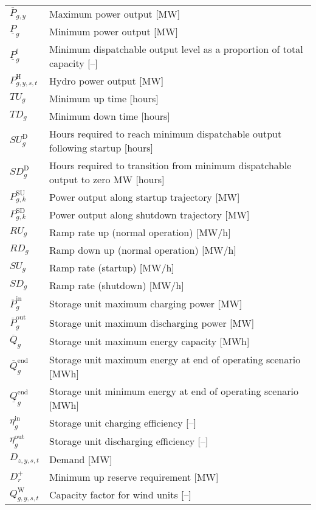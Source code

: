 \documentclass{article}
\newcommand{\iGenerator}{g}
\newcommand{\iYear}{y}
\newcommand{\iScenario}{s}
\newcommand{\iInterval}{t}
\newcommand{\iIntervalAlias}{k}
\newcommand{\iZone}{z}
\newcommand{\iRegion}{r}
\newcommand{\cPowerOutputMax}[1][\iGenerator,\iYear]{\overline{P}_{#1}}
\newcommand{\cReserveUpRequirement}[1][\iRegion]{D^{+}_{#1}}
\newcommand{\cUpTimeMin}[1][\iGenerator]{TU_{#1}}
\newcommand{\cDownTimeMin}[1][\iGenerator]{TD_{#1}}
\newcommand{\cRampRateUp}[1][\iGenerator]{RU_{#1}}
\newcommand{\cRampRateDown}[1][\iGenerator]{RD_{#1}}
\newcommand{\cPowerOutputMin}[1][\iGenerator]{\underline{P}_{#1}}
\newcommand{\cStartupDuration}[1][\iGenerator]{SU_{#1}^{\mathrm{D}}}
\newcommand{\cStartupTrajectory}[1][\iGenerator,\iIntervalAlias]{P^{\mathrm{SU}}_{#1}}
\newcommand{\cShutdownDuration}[1][\iGenerator]{SD_{#1}^{\mathrm{D}}}
\newcommand{\cShutdownTrajectory}[1][\iGenerator,\iIntervalAlias]{P^{\mathrm{SD}}_{#1}}
\newcommand{\cCapacityFactorWind}[1][\iGenerator,\iYear,\iScenario,\iInterval]{Q_{#1}^{\mathrm{W}}}
\newcommand{\cPowerChargingMax}[1][\iGenerator]{\overline{P}^{\mathrm{in}}_{#1}}
\newcommand{\cPowerDischargingMax}[1][\iGenerator]{\overline{P}^{\mathrm{out}}_{#1}}
\newcommand{\cStorageUnitEnergyMax}[1][\iGenerator]{\overline{Q}_{#1}}
\newcommand{\cStorageUnitEnergyIntervalEndMax}[1][\iGenerator]{\overline{Q}^{\mathrm{end}}_{#1}}
\newcommand{\cStorageUnitEnergyIntervalEndMin}[1][\iGenerator]{\underline{Q}^{\mathrm{end}}_{#1}}
\newcommand{\cStorageUnitEfficiencyCharging}{\eta_{\iGenerator}^{\mathrm{in}}}
\newcommand{\cStorageUnitEfficiencyDischarging}{\eta_{\iGenerator}^{\mathrm{out}}}
\newcommand{\cDemand}[1][\iZone,\iYear,\iScenario,\iInterval]{D_{#1}}
\newcommand{\cPowerOutputMinProportion}{\cPowerOutputMin^{\mathrm{f}}}
\newcommand{\cRampRateStartup}[1][\iGenerator]{SU_{#1}}
\newcommand{\cRampRateShutdown}[1][\iGenerator]{SD_{#1}}
\newcommand{\cPowerOutputHydro}[1][\iGenerator,\iYear,\iScenario,\iInterval]{P^{\mathrm{H}}_{#1}}
\begin{document}
\begin{longtable}{ p{}  p{}}
	$\cPowerOutputMax$ & Maximum power output [MW]\\
	$\cPowerOutputMin$ & Minimum power output [MW]\\
	$\cPowerOutputMinProportion$ & Minimum dispatchable output level as a proportion of total capacity [--]\\
	$\cPowerOutputHydro$ & Hydro power output [MW]\\
	$\cUpTimeMin$ & Minimum up time [hours]\\
	$\cDownTimeMin$ & Minimum down time [hours]\\
	$\cStartupDuration$ & Hours required to reach minimum dispatchable output following startup [hours]\\
	$\cShutdownDuration$ & Hours required to transition from minimum dispatchable output to zero MW [hours]\\
	$\cStartupTrajectory$ & Power output along startup trajectory [MW]\\
	$\cShutdownTrajectory$ & Power output along shutdown trajectory [MW]\\
	$\cRampRateUp$ & Ramp rate up (normal operation) [MW/h]\\
	$\cRampRateDown$ & Ramp down up (normal operation) [MW/h]\\
	$\cRampRateStartup$ & Ramp rate (startup) [MW/h]\\
	$\cRampRateShutdown$ & Ramp rate (shutdown) [MW/h]\\
	$\cPowerChargingMax$ & Storage unit maximum charging power [MW]\\
	$\cPowerDischargingMax$ & Storage unit maximum discharging power [MW]\\
	$\cStorageUnitEnergyMax$ & Storage unit maximum energy capacity [MWh]\\
	$\cStorageUnitEnergyIntervalEndMax$ & Storage unit maximum energy at end of operating scenario [MWh]\\
	$\cStorageUnitEnergyIntervalEndMin$ & Storage unit minimum energy at end of operating scenario [MWh]\\
	$\cStorageUnitEfficiencyCharging$ & Storage unit charging efficiency [--]\\
	$\cStorageUnitEfficiencyDischarging$ & Storage unit discharging efficiency [--]\\
	$\cDemand$ & Demand [MW]\\
	$\cReserveUpRequirement$ & Minimum up reserve requirement [MW]\\
	$\cCapacityFactorWind$ & Capacity factor for wind units [--]\\

\end{longtable}
\end{document}
